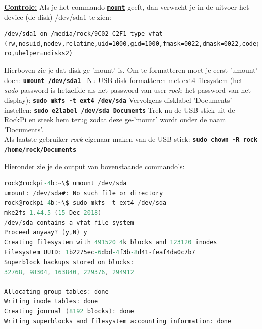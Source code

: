 \underline{\textbf{Controle:}}\newline 
Als je het commando \href{https://www.techrepublic.com/article/linux-101-what-is-the-mount-command-and-how-do-you-use-it/}{\textbf{\texttt{mount}}} geeft, dan verwacht je in de uitvoer het device (de disk) /dev/sda1 te zien: %
\begin{lstlisting}
/dev/sda1 on /media/rock/9C02-C2F1 type vfat (rw,nosuid,nodev,relatime,uid=1000,gid=1000,fmask=0022,dmask=0022,codepage=936,iocharset=utf8,shortname=mixed,showexec,utf8,flush,errors=remount-ro,uhelper=udisks2)
\end{lstlisting}

Hierboven zie je dat disk ge-'mount' is. Om te formatteren moet je eerst 'umount' doen:\newline
\textbf{\texttt{umount /dev/sda1 }}\newline
Nu USB disk formatteren met ext4 filesystem (het \textit{sudo} password is hetzelfde als het password van user \textit{rock}; het password van het display):\newline
\textbf{\texttt{sudo mkfs -t ext4 /dev/sda}}\newline
Vervolgens disklabel 'Documents' instellen:\newline
\textbf{\texttt{sudo e2label /dev/sda Documents}}\newline
Trek nu de USB stick uit de RockPi en steek hem terug zodat deze ge-'mount' wordt onder de naam 'Documents'.\\
Als laatste gebruiker \textit{rock} eigenaar maken van de USB stick:\newline
\textbf{\texttt{sudo chown -R rock /home/rock/Documents}}\newline

Hieronder zie je de output van bovenstaande commando's:
	
\begin{lstlisting}[language=C]   % Gert: Is het niet, maar hiermee doet hij geen speciale opmaak
rock@rockpi-4b:~\$ umount /dev/sda
umount: /dev/sda#: No such file or directory
rock@rockpi-4b:~\$ sudo mkfs -t ext4 /dev/sda
mke2fs 1.44.5 (15-Dec-2018)
/dev/sda contains a vfat file system
Proceed anyway? (y,N) y
Creating filesystem with 491520 4k blocks and 123120 inodes
Filesystem UUID: 1b2275ec-6dbd-4f3b-8d41-feaf4da0c7b7
Superblock backups stored on blocks:
32768, 98304, 163840, 229376, 294912

Allocating group tables: done
Writing inode tables: done
Creating journal (8192 blocks): done
Writing superblocks and filesystem accounting information: done
\end{lstlisting}

